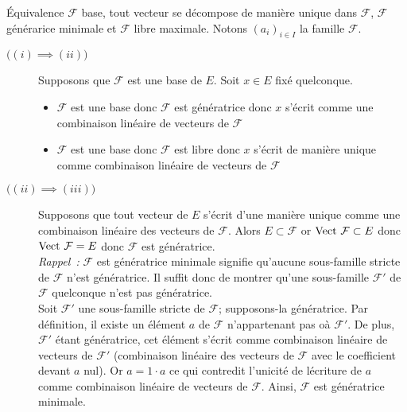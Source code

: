 \documentclass{article}
\renewenvironment{question_kholle}[2][ ]
{
	\subsection{\texorpdfstring{#2}{}}
	\notblank{#1}
	{
		\noindent #1
		\bigbreak
	}
	{}
	\begin{proof}
}
{
	\end{proof}
}
\begin{document}
{Équivalence $\mathcal{F}$ base, tout vecteur se décompose de manière unique dans $\mathcal{F}$, $\mathcal{F}$ générarice minimale et $\mathcal{F}$ libre maximale.}
	Notons $(a_{i})_{i\in I}$ la famille $\mathcal{F}$.
	\begin{description}
		\item[$\bigl((i) \implies (ii)\bigr)$] Supposons que $\mathcal{F}$ est une base de $E$. Soit $x\in E$ fixé quelconque.
		      \begin{itemize}
			      \item $\mathcal{F}$ est une base donc $\mathcal{F}$ est génératrice donc $x$ s’écrit comme une combinaison linéaire de vecteurs de $\mathcal{F}$
			      \item $\mathcal{F}$ est une base donc $\mathcal{F}$ est libre donc $x$ s’écrit de manière unique comme combinaison linéaire de vecteurs de $\mathcal{F}$
		      \end{itemize}

		\item[$\bigl((ii) \implies (iii)\bigr)$] Supposons que tout vecteur de $E$ s’écrit d’une manière unique comme une combinaison linéaire des vecteurs de $\mathcal{F}$. Alors $E\subset \mathcal{F}$ or $\text{Vect } \mathcal{F}\subset E$ donc $\text{Vect } \mathcal{F} = E$ donc $\mathcal F$ est génératrice.\\[4pt]
		      \quad \textit{Rappel~:} $\mathcal{F}$ est génératrice minimale signifie qu’aucune sous-famille stricte de $\mathcal{F}$ n’est génératrice. Il suffit donc de montrer qu’une sous-famille $\mathcal{F}'$ de $\mathcal{F}$ quelconque n’est pas génératrice.\\[4pt]
		      Soit $\mathcal{F'}$ une sous-famille stricte de $\mathcal{F}$; supposons-la génératrice. Par définition, il existe un élément $a$ de $\mathcal{F}$ n’appartenant pas oà $\mathcal{F'}$. De plus, $\mathcal{F'}$ étant génératrice, cet élément s’écrit comme combinaison linéaire de vecteurs de $\mathcal{F'}$ (combinaison linéaire des vecteurs de $\mathcal{F}$ avec le coefficient devant $a$ nul). Or $a=1 \cdot a$ ce qui contredit l’unicité de lécriture de $a$ comme combinaison linéaire de vecteurs de $\mathcal{F}$. Ainsi, $\mathcal{F}$ est génératrice minimale.


\end{description}
\end{question_kholle}
\end{document}
